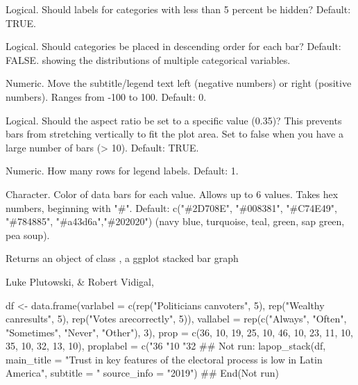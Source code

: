 \documentclass[a4paper]{book}
\begin{document}
\begin{Arguments}
\begin{ldescription}
\item[\code{hide\_small\_values}] Logical.  Should labels for categories with less than 5 percent be hidden?  Default: TRUE.

\item[\code{order\_bars}] Logical.  Should categories be placed in descending order for each bar?  Default: FALSE.
showing the distributions of multiple categorical variables.

\item[\code{subtitle\_h\_just}] Numeric.  Move the subtitle/legend text left (negative numbers) or right (positive numbers).
Ranges from -100 to 100.  Default: 0.

\item[\code{fixed\_aspect\_ratio}] Logical.  Should the aspect ratio be set to a specific value (0.35)?
This prevents bars from stretching vertically to fit the plot area.  Set to false when you have
a large number of bars (> 10).  Default: TRUE.

\item[\code{legendnrow}] Numeric.  How many rows for legend labels. Default: 1.

\item[\code{color\_scheme}] Character.  Color of data bars for each value.  Allows up to 6 values.
Takes hex numbers, beginning with "\#".
Default: c("\#2D708E", "\#008381", "\#C74E49", "\#784885", "\#a43d6a","\#202020")
(navy blue, turquoise, teal, green, sap green, pea soup).
\end{ldescription}
\end{Arguments}
%
\begin{Value}
Returns an object of class , a ggplot stacked bar graph
\end{Value}
%
\begin{Author}
Luke Plutowski,  \& Robert Vidigal, 
\end{Author}
%
\begin{Examples}
\begin{ExampleCode}

df <- data.frame(varlabel = c(rep("Politicians can\nidentify voters", 5),
                              rep("Wealthy can\nbuy results", 5),
                              rep("Votes are\ncounted correctly", 5)),
                 vallabel = rep(c("Always", "Often", "Sometimes",
                                  "Never", "Other"), 3),
                 prop = c(36, 10, 19, 25, 10, 46, 10, 23, 11, 10, 35,
                          10, 32, 13, 10),
                 proplabel = c("36%
                               "10%
                               "32%
## Not run: 
lapop_stack(df,
         main_title = "Trust in key features of the electoral process is low in Latin America",
         subtitle = "%
         source_info = "2019")
## End(Not run)
\end{ExampleCode}
\end{Examples}
\end{document}
